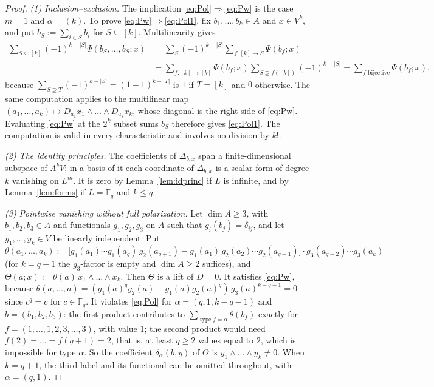 \documentclass[11pt]{amsart}
\theoremstyle{definition}
\theoremstyle{remark}
\numberwithin{equation}{section}
\newcommand{\F}{\mathbb F}
\newcommand{\abs}[1]{\lvert #1\rvert}
\newcommand{\type}{\operatorname{type}}
\begin{document}
\begin{proof}
\emph{(1) Inclusion--exclusion.} The implication \eqref{eq:Pol}$\Rightarrow$\eqref{eq:Pw} is the case $m=1$ and
$\alpha=(k)$. To prove \eqref{eq:Pw}$\Rightarrow$\eqref{eq:Pol1}, fix $b_1,\dots,b_k\in A$ and $x\in V^k$, and put
$b_S:=\sum_{i\in S}b_i$ for $S\subseteq[k]$. Multilinearity gives
\begin{align*}
\sum_{S\subseteq[k]}(-1)^{k-\abs S}\Psi(b_S,\dots,b_S;x)&=\sum_S(-1)^{k-\abs S}\sum_{f\colon[k]\to S}\Psi(b_f;x)\\
&=\sum_{f\colon[k]\to[k]}\Psi(b_f;x)\sum_{S\supseteq f([k])}(-1)^{k-\abs S}=\sum_{f\text{ bijective}}\Psi(b_f;x),
\end{align*}
because $\sum_{S\supseteq T}(-1)^{k-\abs S}=(1-1)^{k-\abs T}$ is $1$ if $T=[k]$ and $0$ otherwise. The same computation
applies to the multilinear map $(a_1,\dots,a_k)\mapsto D_{a_1}x_1\wedge\dots\wedge D_{a_k}x_k$, whose diagonal is the right
side of \eqref{eq:Pw}. Evaluating \eqref{eq:Pw} at the $2^k$ subset sums $b_S$ therefore gives \eqref{eq:Pol1}.
The computation is valid in every characteristic and involves no division by $k!$.

\emph{(2) The identity principles.} The coefficients of $\Delta_{b,x}$ span a finite-dimensional subspace of $\Lambda^kV$; in a basis of it each
coordinate of $\Delta_{b,x}$ is a scalar form of degree $k$ vanishing on $L^m$. It is zero by Lemma~\ref{lem:idprinc}
if $L$ is infinite, and by Lemma~\ref{lem:forms} if $L=\F_q$ and $k\le q$.

\emph{(3) Pointwise vanishing without full polarization.} Let $\dim A\ge3$, with $b_1,b_2,b_3\in A$ and functionals $g_1,g_2,g_3$ on $A$ such that
$g_i(b_j)=\delta_{ij}$, and let $y_1,\dots,y_k\in V$ be linearly independent. Put
\[
\theta(a_1,\dots,a_k):=\bigl[g_1(a_1)\cdots g_1(a_q)\,g_2(a_{q+1})-g_1(a_1)\,g_2(a_2)\cdots g_2(a_{q+1})\bigr]
\cdot g_3(a_{q+2})\cdots g_3(a_k)
\]
(for $k=q+1$ the $g_3$\nobreakdash-factor is empty and $\dim A\ge2$ suffices), and $\Theta(a;x):=\theta(a)\,x_1\wedge\dots\wedge x_k$.
Then $\Theta$ is a lift of $D=0$. It satisfies \eqref{eq:Pw}, because
$\theta(a,\dots,a)=(g_1(a)^qg_2(a)-g_1(a)g_2(a)^q)\,g_3(a)^{k-q-1}=0$ since $c^q=c$ for $c\in\F_q$. It
violates \eqref{eq:Pol} for $\alpha=(q,1,k-q-1)$ and $b=(b_1,b_2,b_3)$: the first product contributes to
$\sum_{\type f=\alpha}\theta(b_f)$ exactly for $f=(1,\dots,1,2,3,\dots,3)$, with value $1$; the second product would need
$f(2)=\dots=f(q+1)=2$, that is, at least $q\ge2$ values equal to $2$, which is impossible for type $\alpha$. So the
coefficient $\delta_\alpha(b,y)$ of $\Theta$ is $y_1\wedge\dots\wedge y_k\neq0$. When $k=q+1$, the third label and its
functional can be omitted throughout, with $\alpha=(q,1)$.


\end{proof}
\end{document}
